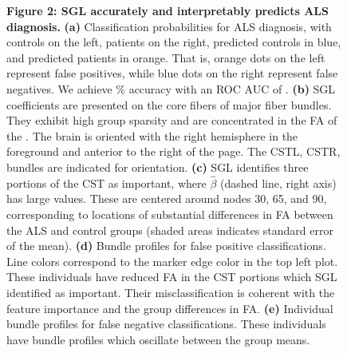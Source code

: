 \documentclass[10pt,letterpaper]{article}
\begin{document}
\begin{figure}[b!]
    {\label{fig:class-results:probs}}
    {\label{fig:class-results:coefs3d}}
    {\label{fig:class-results:tract-profiles}}
    {\label{fig:class-results:false-positives}}
    {\label{fig:class-results:false-negatives}}
    \caption{
    {\bf Figure 2: SGL accurately and interpretably predicts ALS diagnosis.}
    {\bf (a)} Classification probabilities for ALS diagnosis, with
    controls on the left, patients on the right, predicted controls in
    blue, and predicted patients in orange. That is, orange dots on the left
    represent false positives, while blue dots on the right represent
    false negatives. We achieve {\protect\alsAccuracy}\% accuracy with an
    ROC AUC of {\protect\alsRocAuc}.
    {\bf (b)} SGL coefficients are presented on the core fibers of major
    fiber bundles. They exhibit high group sparsity and are concentrated
    in the FA of the .
    The brain is oriented with the right hemisphere
    in the foreground and anterior to the right of the page. The CSTL, CSTR,
    bundles are indicated for orientation.
    {\bf (c)} SGL identifies three portions of the CST as important,
    where $\hat{\beta}$ (dashed line, right axis) has large values. These
    are centered around nodes 30, 65, and 90, corresponding to locations
    of substantial differences in FA between the ALS and control groups
    (shaded areas indicates standard error of the mean).
    {\bf (d)} Bundle profiles for false positive classifications. Line
    colors correspond to the marker edge color in the top left plot.
    These individuals have reduced FA in the CST portions which SGL
    identified as important. Their misclassification is coherent with the
    feature importance and the group differences in FA.
    {\bf (e)} Individual bundle profiles for false negative
    classifications. These individuals have bundle profiles which
    oscillate between the group means.
    \label{fig:class-results}
    }
\end{figure}
\end{document}
